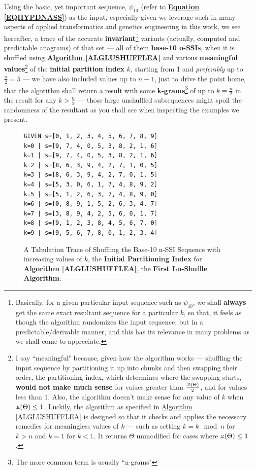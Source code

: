 \documentclass[a4paper, 18pt]{book} %
\newcommand{\invpi}{\rotatebox[origin=c]{180}{$\pi$}}
\begin{document}
Using the basic, yet important sequence, $\psi_{10}$ (refer to \textbf{\hyperref[EQHYPDNASS]{Equation \ref{EQHYPDNASS}}}) as the input, especially given we leverage such in many aspects of applied transformatics and genetics engineering in this work, we see hereafter, a trace of the accurate \textbf{invariant}\footnote{Basically, for a given particular input sequence such as $\psi_{10}$, we shall \textbf{always} get the same exact resultant sequence for a particular $k$, so that, it feels as though the algorithm randomizes the input sequence, but in a predictable/derivable manner, and this has its relevance in many problems as we shall come to appreciate.} variants (actually, computed and predictable anagrams) of that set --- all of them \textbf{base-10 o-SSIs}\cite{ossipaper}, when it is shuffled using \textbf{\hyperref[ALGLUSHUFFLEA]{Algorithm \ref{ALGLUSHUFFLEA}}} and various \textbf{meaningful values}\footnote{I say ``meaningful" because, given how the algorithm works --- shuffling the input sequence by partitioning it up into chunks and then swapping their order, the partitioning index, which determines where the swapping starts, \textbf{would not make much sense} for values greater than $\frac{\invpi(\Theta)}{2}$, and for values less than $1$. Also, the algorithm doesn't make sense for any value of $k$ when $\invpi(\Theta) \leq 1$. Luckily, the algorithm as specified in \hyperref[ALGLUSHUFFLEA]{Algorithm \ref{ALGLUSHUFFLEA}} is designed so that it checks and applies the necessary remedies for meaningless values of $k$ --- such as setting $k = k \mod n$ for $k > n$ and $k=1$ for $k < 1$. It returns $\Theta$ unmodified for cases where $\invpi(\Theta) \leq 1$.} of the \textbf{initial partition index} $k$, starting from 1 and \textit{preferably} up to $\frac{n}{2} = 5$ --- we have also included values up to $n-1$, just to drive the point home, that the algorithm shall return a result with some \textbf{k-grams}\footnote{The more common term is usually ``n-grams"} of up to $k = \frac{n}{2}$ in the result for any $k > \frac{n}{2}$ --- those large unshuffled subsequences might spoil the randomness of the resultant as you shall see when inspecting the examples we present. 

\begin{figure}[H]
  \begin{center}
\Large
\begin{verbatim}
GIVEN s=[0, 1, 2, 3, 4, 5, 6, 7, 8, 9]
k=0 | s=[9, 7, 4, 0, 5, 3, 8, 2, 1, 6]
k=1 | s=[9, 7, 4, 0, 5, 3, 8, 2, 1, 6]
k=2 | s=[8, 6, 3, 9, 4, 2, 7, 1, 0, 5]
k=3 | s=[8, 6, 3, 9, 4, 2, 7, 0, 1, 5]
k=4 | s=[5, 3, 0, 6, 1, 7, 4, 8, 9, 2]
k=5 | s=[5, 1, 2, 6, 3, 7, 4, 8, 9, 0]
k=6 | s=[0, 8, 9, 1, 5, 2, 6, 3, 4, 7]
k=7 | s=[3, 8, 9, 4, 2, 5, 6, 0, 1, 7]
k=8 | s=[9, 1, 2, 3, 8, 4, 5, 6, 7, 0]
k=9 | s=[9, 5, 6, 7, 8, 0, 1, 2, 3, 4]
\end{verbatim}

   \caption{A Tabulation Trace of Shuffling the Base-10 n-SSI Sequence with increasing values of $k$, the \textbf{Initial Partitioning Index} for \textbf{\hyperref[ALGLUSHUFFLEA]{Algorithm \ref{ALGLUSHUFFLEA}}}, the \textbf{First Lu-Shuffle Algorithm}.}
  \label{FIGTRACEFLSA}
  \end{center}
\end{figure}
\end{document}
